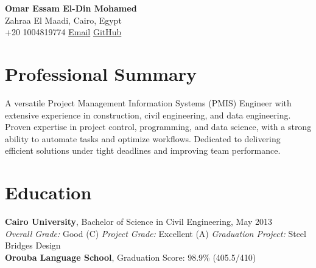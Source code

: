 \documentclass[10pt, letterpaper]{article}
\begin{document}
    \begin{center}
        {\LARGE \textbf{Omar Essam El-Din Mohamed}} \\
        {Zahraa El Maadi, Cairo, Egypt} \\
        {\faPhone* \hspace{0.2cm} +20 1004819774} \hspace{1cm}
        {\href{mailto:eng.omar.e@gmail.com}{\faEnvelope[regular] \hspace{0.2cm} Email}} \hspace{1cm}
        {\href{https://github.com/omare32}{\faGithub \hspace{0.2cm} GitHub}}
    \end{center}
    
    \section{Professional Summary}
    A versatile Project Management Information Systems (PMIS) Engineer with extensive experience in construction, civil engineering, and data engineering. Proven expertise in project control, programming, and data science, with a strong ability to automate tasks and optimize workflows. Dedicated to delivering efficient solutions under tight deadlines and improving team performance.
    
    \section{Education}
    \textbf{Cairo University}, Bachelor of Science in Civil Engineering, May 2013 \\
    \textit{Overall Grade:} Good (C) \hspace{1cm} \textit{Project Grade:} Excellent (A) \hspace{1cm} \textit{Graduation Project:} Steel Bridges Design \\
    \textbf{Orouba Language School}, Graduation Score: 98.9\% (405.5/410)
    
\end{document}
